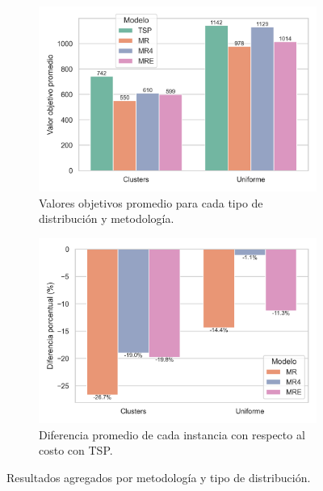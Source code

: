 \documentclass[10pt]{article}
\begin{document}
\begin{figure}[htbp]
	\centering
	
	\begin{subfigure}[b]{0.49\textwidth}
		\centering
		\includegraphics[width=\textwidth]{figuras/barras_costos.png}
		\caption{Valores objetivos promedio para cada tipo de distribución y metodología.}
		\label{fig:barras_costos}
	\end{subfigure}
	\hfill
	\begin{subfigure}[b]{0.49\textwidth}
		\centering
		\includegraphics[width=\textwidth]{figuras/barras_diferencias_pct.png}
		\caption{Diferencia promedio de cada instancia con respecto al costo con TSP.}
		\label{fig:dif_pct_costos}
	\end{subfigure}
	
	\caption{Resultados agregados por metodología y tipo de distribución.}
	\label{fig:comparacion_costos}
\end{figure}
\end{document}
